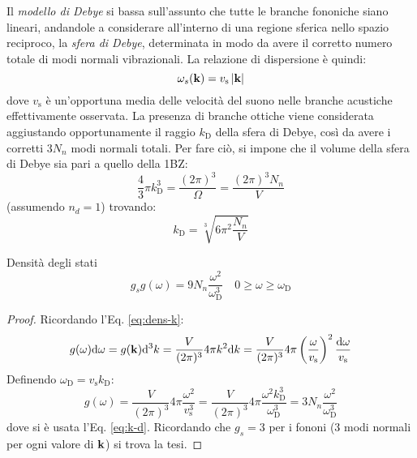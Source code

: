 Il \textit{modello di Debye} si bassa sull'assunto che tutte le branche fononiche siano lineari, andandole a considerare all'interno di una regione sferica nello spazio reciproco, la \textit{sfera di Debye}, determinata in modo da avere il corretto numero totale di modi normali vibrazionali. La relazione di dispersione è quindi:
\begin{equation}
	\omega_s(\mathbf{k}) = v_\text{s} \left\lvert\mathbf{k}\right\rvert
\end{equation}
dove $ v_\text{s} $ è un'opportuna media delle velocità del suono nelle branche acustiche effettivamente osservata. La presenza di branche ottiche viene considerata aggiustando opportunamente il raggio $ k_\text{D} $ della sfera di Debye, così da avere i corretti $ 3N_n $ modi normali totali. Per fare ciò, si impone che il volume della sfera di Debye sia pari a quello della 1BZ:
\begin{equation*}
	\frac{4}{3} \pi k_\text{D}^3 = \frac{(2\pi)^3}{\Omega} = \frac{(2\pi)^3 N_n}{V}
\end{equation*}
(assumendo $ n_d = 1 $) trovando:
\begin{equation}
	k_\text{D} = \sqrt[3]{6 \pi^2 \frac{N_n}{V}}
	\label{eq:k-d}
\end{equation}

\begin{proposition}[before upper = {\tcbtitle}]{Densità degli stati}{}
	\begin{equation}
		g_s g(\omega) = 9 N_n \frac{\omega^2}{\omega_\text{D}^3}
		\quad
		0 \ge \omega \ge \omega_\text{D}
	\end{equation}

	\tcblower

	\begin{proof}
		Ricordando l'Eq. \ref{eq:dens-k}:
		\begin{equation*}
			g(\omega) \mathrm{d} \omega = g(\mathbf{k}) \mathrm{d}^3k = \frac{V}{(2\pi)^3} 4\pi k^2 \mathrm{d} k = \frac{V}{(2\pi)^3} 4\pi \left( \frac{\omega}{v_\text{s}} \right)^2 \frac{\mathrm{d} \omega}{v_\text{s}}
		\end{equation*}
		Definendo $ \omega_\text{D} = v_\text{s} k_\text{D} $:
		\begin{equation*}
			g(\omega) = \frac{V}{(2\pi)^3} 4\pi \frac{\omega^2}{v_\text{s}^3} = \frac{V}{(2\pi)^3} 4\pi \frac{\omega^2 k_\text{D}^3}{\omega_\text{D}^3} = 3N_n \frac{\omega^2}{\omega_\text{D}^3}
		\end{equation*}
		dove si è usata l'Eq. \ref{eq:k-d}. Ricordando che $ g_s = 3 $ per i fononi (3 modi normali per ogni valore di $ \mathbf{k} $) si trova la tesi.
	\end{proof}
\end{proposition}

